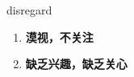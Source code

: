 
\begin{frame}
{\huge disregard}
\begin{center}
\begin{enumerate}\Large
  \item \textbf{漠视，不关注}
  \item \textbf{缺乏兴趣，缺乏关心}
\end{enumerate}
\end{center}
\end{frame}
